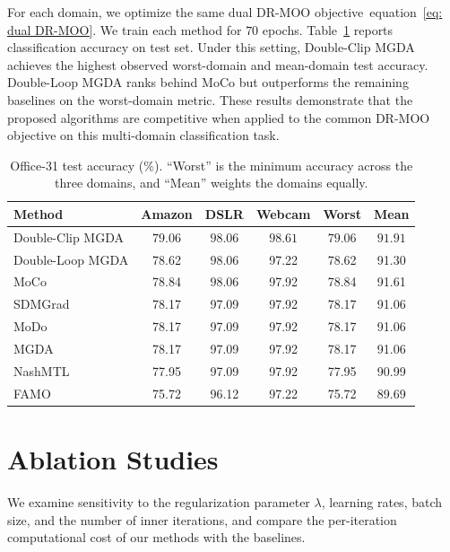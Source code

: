 \documentclass[twoside]{article} %
\def\eqref#1{equation~\ref{#1}}
\theoremstyle{plain}
\theoremstyle{definition}
\theoremstyle{remark}
\begin{document}
For each domain, we optimize the same dual DR-MOO objective~\eqref{eq: dual DR-MOO}. We train each method for $70$ epochs. Table~\ref{table:accuracy-office31} reports classification accuracy on test set. Under this setting, Double-Clip MGDA achieves the highest observed worst-domain and mean-domain test accuracy. Double-Loop MGDA ranks behind MoCo but outperforms the remaining baselines on the worst-domain metric. These results demonstrate that the proposed algorithms are competitive when applied to the common DR-MOO objective on this multi-domain classification task.
\begin{table}[ht]
\centering
\small
\caption{Office-31 test accuracy (\%). ``Worst'' is the minimum accuracy across the three domains, and ``Mean'' weights the domains equally.}
\label{table:accuracy-office31}

\scriptsize
\renewcommand{\arraystretch}{1.08}
\setlength{\tabcolsep}{1.5pt}
{
\begin{tabular*}{\textwidth}{
    @{\extracolsep{\fill}}
    lccccc
    @{}
}
\toprule
\textbf{Method} & \textbf{Amazon} & \textbf{DSLR} & \textbf{Webcam} & \textbf{Worst} & \textbf{Mean} \\
\midrule
Double-Clip MGDA & $\boldsymbol{79.06}$ & $\boldsymbol{98.06}$ & $\boldsymbol{98.61}$ & $\boldsymbol{79.06}$ & $\boldsymbol{91.91}$ \\
Double-Loop MGDA & 78.62 & $\boldsymbol{98.06}$ & 97.22 & 78.62 & 91.30 \\
MoCo~\citep{MOCO} & 78.84 & $\boldsymbol{98.06}$ & 97.92 & 78.84 & 91.61 \\
SDMGrad~\citep{SDMkaiyiJi} & 78.17 & 97.09 & 97.92 & 78.17 & 91.06 \\
MoDo~\citep{MODO} & 78.17 & 97.09 & 97.92 & 78.17 & 91.06 \\
MGDA~\citep{MGDA1stwork,qimgda} & 78.17 & 97.09 & 97.92 & 78.17 & 91.06 \\
NashMTL~\citep{nashMTL} & 77.95 & 97.09 & 97.92 & 77.95 & 90.99 \\
FAMO~\citep{FAMO} & 75.72 & 96.12 & 97.22 & 75.72 & 89.69 \\
\bottomrule
\end{tabular*}}
\end{table}

\section{Ablation Studies}\label{Appendix: Ablation study}
We examine sensitivity to the regularization parameter $\lambda$, learning rates, batch size, and the number of inner iterations, and compare the per-iteration computational cost of our methods with the baselines.
\end{document}
